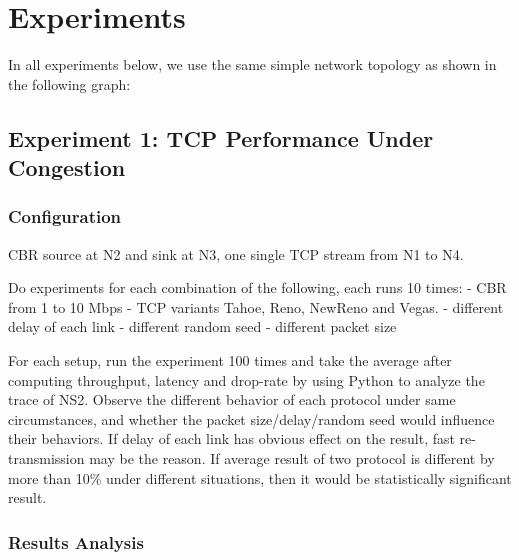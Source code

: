 \documentclass[10pt, conference]{IEEEtran/IEEEtran}
\begin{document}
\section{Experiments}
In all experiments below, we use the same simple network topology as shown in the following graph:

\centerline{
}

\subsection{Experiment 1: TCP Performance Under Congestion}
\subsubsection{Configuration}

CBR source at N2 and sink at N3, one single TCP stream from N1 to N4.

Do experiments for each combination of the following, each runs 10 times:
- CBR from 1 to 10 Mbps 
- TCP variants Tahoe, Reno, NewReno and Vegas.
- different delay of each link
- different random seed
- different packet size

For each setup, run the experiment 100 times and take the average
after computing throughput, latency and drop-rate by using Python to analyze the
trace of NS2. Observe the different behavior of each protocol under same
circumstances, and whether the packet size/delay/random seed would
influence their behaviors. If delay of each link has obvious effect on the result,
fast re-transmission may be the reason. If average result of two protocol is different by more than
10\% under different situations, then it would be statistically significant result.
\subsubsection{Results Analysis}
\end{document}
